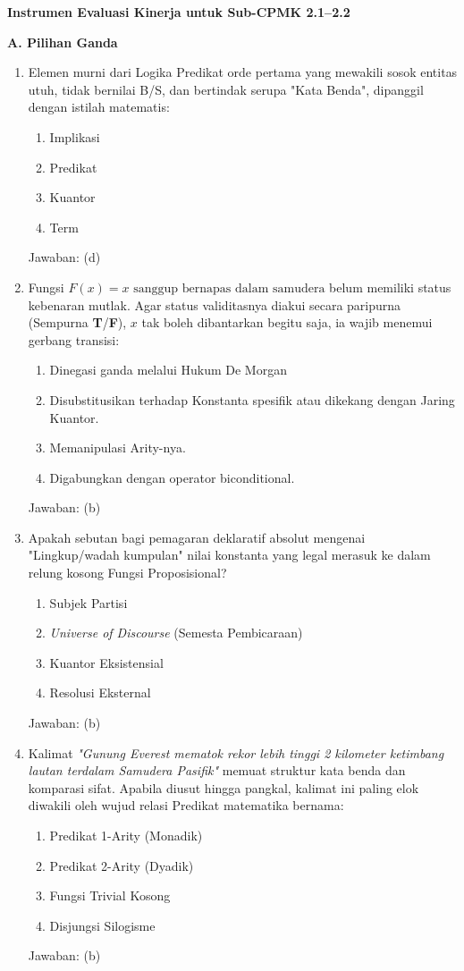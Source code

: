 \documentclass[../main]{subfiles}
\begin{document}
\begin{asesmen}
\textbf{Instrumen Evaluasi Kinerja untuk Sub-CPMK 2.1--2.2}

\textbf{A. Pilihan Ganda}
\begin{enumerate}
  \item Elemen murni dari Logika Predikat orde pertama yang mewakili sosok entitas utuh, tidak bernilai B/S, dan bertindak serupa "Kata Benda", dipanggil dengan istilah matematis:
  \begin{enumerate}
    \item Implikasi
    \item Predikat
    \item Kuantor
    \item Term
  \end{enumerate}
  Jawaban: (d)

  \item Fungsi $F(x) = x \text{ sanggup bernapas dalam samudera}$ belum memiliki status kebenaran mutlak. Agar status validitasnya diakui secara paripurna (Sempurna \textbf{T}/\textbf{F}), $x$ tak boleh dibantarkan begitu saja, ia wajib menemui gerbang transisi:
  \begin{enumerate}
    \item Dinegasi ganda melalui Hukum De Morgan
    \item Disubstitusikan terhadap Konstanta spesifik atau dikekang dengan Jaring Kuantor.
    \item Memanipulasi Arity-nya.
    \item Digabungkan dengan operator biconditional.
  \end{enumerate}
  Jawaban: (b)

  \item Apakah sebutan bagi pemagaran deklaratif absolut mengenai "Lingkup/wadah kumpulan" nilai konstanta yang legal merasuk ke dalam relung kosong Fungsi Proposisional?
  \begin{enumerate}
    \item Subjek Partisi
    \item \textit{Universe of Discourse} (Semesta Pembicaraan)
    \item Kuantor Eksistensial
    \item Resolusi Eksternal
  \end{enumerate}
  Jawaban: (b)

  \item Kalimat \textit{"Gunung Everest mematok rekor lebih tinggi 2 kilometer ketimbang lautan terdalam Samudera Pasifik"} memuat struktur kata benda dan komparasi sifat. Apabila diusut hingga pangkal, kalimat ini paling elok diwakili oleh wujud relasi Predikat matematika bernama:
  \begin{enumerate}
    \item Predikat 1-Arity (Monadik)
    \item Predikat 2-Arity (Dyadik)
    \item Fungsi Trivial Kosong
    \item Disjungsi Silogisme
  \end{enumerate}
  Jawaban: (b)
\end{enumerate}


\end{asesmen}
\end{document}
